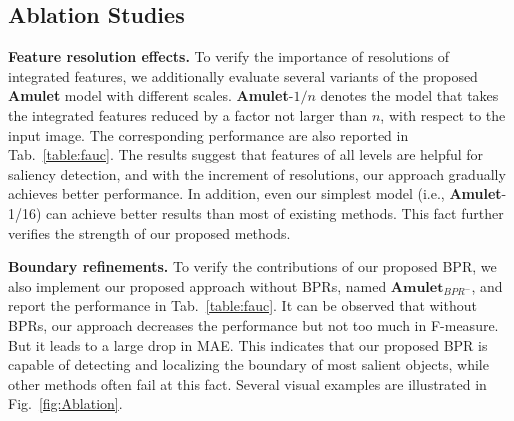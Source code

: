 \documentclass[10pt,twocolumn,letterpaper]{article}
\begin{document}
\subsection{Ablation Studies}
\textbf{Feature resolution effects.} To verify the importance of resolutions of integrated features, we additionally evaluate several variants of the proposed \textbf{Amulet} model with different scales.
\textbf{Amulet}-$1/n$ denotes the model that takes the integrated features reduced by a factor not larger than $n$, with respect to the input image.
The corresponding performance are also reported in Tab.~\ref{table:fauc}.
The results suggest that features of all levels are helpful for saliency detection, and with the increment of resolutions, our approach gradually achieves better performance.
In addition, even our simplest model (i.e., \textbf{Amulet}-1/16) can achieve better results than most of existing methods.
This fact further verifies the strength of our proposed methods.

\textbf{Boundary refinements.}
To verify the contributions of our proposed BPR, we also implement our proposed approach without BPRs, named $\textbf{Amulet}_{BPR^{-}}$, and report the performance in Tab.~\ref{table:fauc}.
It can be observed that without BPRs, our approach decreases the performance but not too much in F-measure.
But it leads to a large drop in MAE. This indicates that our proposed BPR is capable of detecting and
localizing the boundary of most salient objects, while other methods often fail at this fact.
Several visual examples are illustrated in Fig.~\ref{fig:Ablation}.
\end{document}
